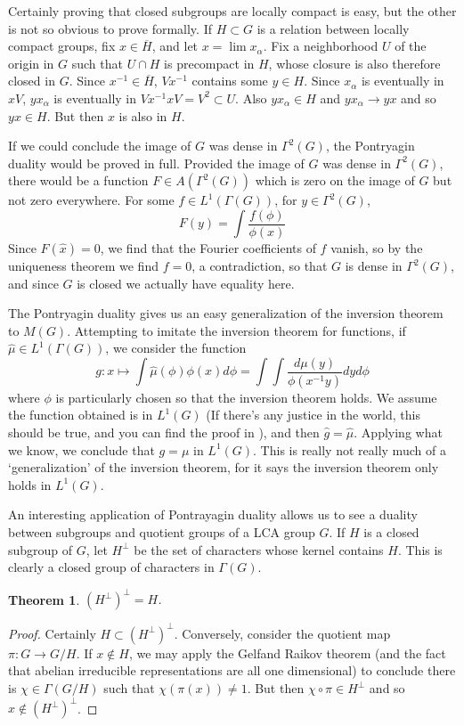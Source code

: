 \documentclass{article}
\theoremstyle{plain}
\newtheorem{theorem}{Theorem}
\theoremstyle{definition}
\begin{document}
Certainly proving that closed subgroups are locally compact is easy, but the other is not so obvious to prove formally. If $H \subset G$ is a relation between locally compact groups, fix $x \in \overline{H}$, and let $x = \lim x_\alpha$. Fix a neighborhood $U$ of the origin in $G$ such that $U \cap H$ is precompact in $H$, whose closure is also therefore closed in $G$. Since $x^{-1} \in \overline{H}$, $Vx^{-1}$ contains some $y \in H$. Since $x_\alpha$ is eventually in $xV$, $y x_\alpha$ is eventually in $Vx^{-1}xV = V^2 \subset U$. Also $yx_\alpha \in H$ and $yx_\alpha \to yx$ and so $yx \in H$. But then $x$ is also in $H$.

If we could conclude the image of $G$ was dense in $\Gamma^2(G)$, the Pontryagin duality would be proved in full. Provided the image of $G$ was dense in $\Gamma^2(G)$, there would be a function $F \in A(\Gamma^2(G))$ which is zero on the image of $G$ but not zero everywhere. For some $f \in L^1(\Gamma(G))$, for $y \in \Gamma^2(G)$,
%
\[ F(y) = \int \frac{f(\phi)}{\phi(x)} \]
%
Since $F(\hat{x}) = 0$, we find that the Fourier coefficients of $f$ vanish, so by the uniqueness theorem we find $f = 0$, a contradiction, so that $G$ is dense in $\Gamma^2(G)$, and since $G$ is closed we actually have equality here.

The Pontryagin duality gives us an easy generalization of the inversion theorem to $M(G)$. Attempting to imitate the inversion theorem for functions, if $\widehat{\mu} \in L^1(\Gamma(G))$, we consider the function
%
\[ g: x \mapsto \int \widehat{\mu}(\phi) \phi(x) d\phi = \int \int \frac{d\mu(y)}{\phi(x^{-1}y)} dy d\phi \]
%
where $\phi$ is particularly chosen so that the inversion theorem holds. We assume the function obtained is in $L^1(G)$ (If there's any justice in the world, this should be true, and you can find the proof in \cite{rudin}), and then $\hat{g} = \hat{\mu}$. Applying what we know, we conclude that $g = \mu$ in $L^1(G)$. This is really not really much of a `generalization' of the inversion theorem, for it says the inversion theorem only holds in $L^1(G)$.

An interesting application of Pontrayagin duality allows us to see a duality between subgroups and quotient groups of a LCA group $G$. If $H$ is a closed subgroup of $G$, let $H^\perp$ be the set of characters whose kernel contains $H$. This is clearly a closed group of characters in $\Gamma(G)$.

\begin{theorem}
    $(H^\perp)^\perp = H$.
\end{theorem}
\begin{proof}
    Certainly $H \subset (H^\perp)^\perp$. Conversely, consider the quotient map $\pi: G \to G/H$. If $x \not \in H$, we may apply the Gelfand Raikov theorem (and the fact that abelian irreducible representations are all one dimensional) to conclude there is $\chi \in \Gamma(G/H)$ such that $\chi(\pi(x)) \neq 1$. But then $\chi \circ \pi \in H^\perp$ and so $x \not \in (H^\perp)^\perp$.
\end{proof}
\end{document}

